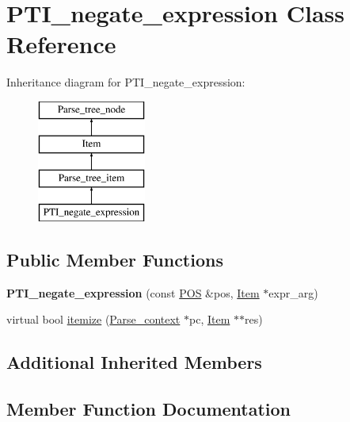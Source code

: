 \hypertarget{classPTI__negate__expression}{}\section{P\+T\+I\+\_\+negate\+\_\+expression Class Reference}
\label{classPTI__negate__expression}
Inheritance diagram for P\+T\+I\+\_\+negate\+\_\+expression\+:\begin{figure}[H]
\begin{center}
\leavevmode
\includegraphics[height=4.000000cm]{classPTI__negate__expression}
\end{center}
\end{figure}
\subsection*{Public Member Functions}
\begin{DoxyCompactItemize}
\item 
\mbox{\label{classPTI__negate__expression_a7939115c38c16dee1eaf6659e5358848}} 
{\bfseries P\+T\+I\+\_\+negate\+\_\+expression} (const \mbox{\hyperlink{structYYLTYPE}{P\+OS}} \&pos, \mbox{\hyperlink{classItem}{Item}} $\ast$expr\+\_\+arg)
\item 
virtual bool \mbox{\hyperlink{classPTI__negate__expression_acfb830168ceffe8ca4563665a1016297}{itemize}} (\mbox{\hyperlink{structParse__context}{Parse\+\_\+context}} $\ast$pc, \mbox{\hyperlink{classItem}{Item}} $\ast$$\ast$res)
\end{DoxyCompactItemize}
\subsection*{Additional Inherited Members}


\subsection{Member Function Documentation}
\mbox{\label{classPTI__negate__expression_acfb830168ceffe8ca4563665a1016297}} 
